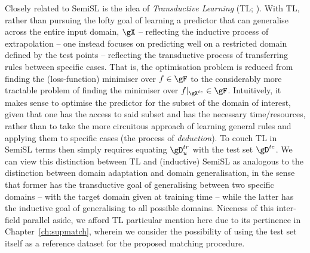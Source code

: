 %
%
Closely related to \ac{SemiSL} is the idea of \emph{Transductive Learning} (TL;
\citealp{gammerman1998learning}).
%
With TL, rather than pursuing the lofty goal of learning a predictor that can generalise across the
entire input domain, \( \gX \) -- reflecting the inductive process of extrapolation -- one instead
focuses on predicting well on a restricted domain defined by the test points -- reflecting the
transductive process of transferring rules between specific cases. 
%
That is, the optimisation problem is reduced from finding the (loss-function) minimiser over \(f
\in \gF \)  to the considerably more tractable problem of finding the minimiser over \(
f|_{\gX^{te}} \in \gF \).
%
Intuitively, it makes sense to optimise the predictor for the subset of the domain of interest,
given that one has the access to said subset and has the necessary time/resources, rather than to
take the more circuitous approach of learning general rules and applying them to specific cases
(the process of \emph{deduction}).
%
To couch TL in \ac{SemiSL} terms then simply requires equating \(\gD^{tr}_u \) with the test set
\(\gD^{te} \).
%
We can view this distinction between TL and (inductive) \ac{SemiSL} as analogous to the distinction
between domain adaptation and domain generalisation, in the sense that former has the transductive
goal of generalising between two specific domains -- with the target domain given at training time
-- while the latter has the inductive goal of generalising to all possible domains.
%
Niceness of this inter-field parallel aside, we afford TL particular mention here due to its
pertinence in Chapter~\ref{ch:supmatch}, wherein we consider the possibility of using the test set
itself as a reference dataset for the proposed matching procedure.


